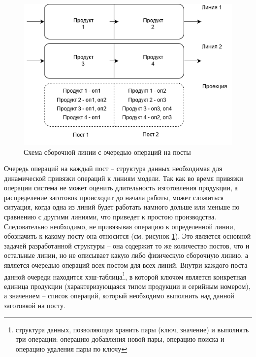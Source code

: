 \begin{figure}[ht]
	\centering
	\includegraphics[width=\linewidth]{pics/assemblyBind.png}
	\caption{Схема сборочной линии с очередью операций на посты}
	\label{fig:bind}
\end{figure}

\indent Очередь операций на каждый пост -- структура данных необходимая для динамической привязки операций к линиям модели.
Так как во время привязки операции система не может оценить длительность изготовления продукции, а распределение заготовок происходит до начала работы, может сложиться ситуация, когда одна из линий будет работать намного дольше или меньше по сравнению с другими линиями, что приведет к простою производства.
Следовательно необходимо, не привязывая операцию к определенной линии, обозначить к какому посту она относится (см. рисунок \ref{fig:bind}).
Это является основной задачей разработанной структуры -- она содержит то же количество постов, что и остальные линии, но не описывает какую либо физическую сборочную линию, а является очередью операций всех постом для всех линий.
Внутри каждого поста данной очереди находится хэш-таблица\footnote{структура данных, позволяющая хранить пары (ключ, значение) и выполнять три операции: операцию добавления новой пары, операцию поиска и операцию удаления пары по ключу}, в которой ключом является конкретная единица продукции (характеризующаяся типом продукции и серийным номером), а значением -- список операций, который необходимо выполнить над данной заготовкой на посту.

